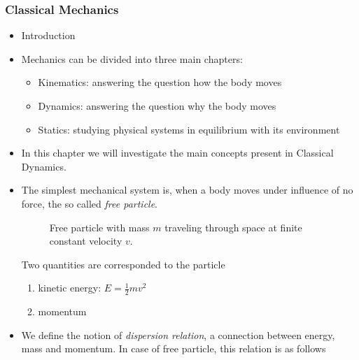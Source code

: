 \documentclass[t,aspectratio=169]{beamer}
\begin{document}
\begin{frame}
\frametitle{Classical Mechanics}
\begin{itemize}
\item Introduction
\item Mechanics can be divided into three main chapters:
\begin{itemize}
\item Kinematics: answering the question how the body moves
\item Dynamics: answering the question why the body moves
\item Statics: studying physical systems in equilibrium with its environment
\end{itemize}
\item In this chapter we will investigate the main concepts present in Classical Dynamics.

\pagebreak 
\item The simplest mechanical system is, when a body moves under influence of no force, the so called \emph{free particle}.
\begin{center}
\begin{figure}
\caption{Free particle with mass $m$ traveling through space at finite constant velocity $v$.}
\end{figure}
\end{center}
Two quantities are corresponded to the particle
\begin{enumerate}
\item kinetic energy: $E=\frac{1}{2}mv^{2}$
\item momentum
\end{enumerate}
\item We define the notion of \emph{dispersion relation}, a connection between energy, mass and momentum. In case of free particle, this relation is as follows


\pagebreak


\end{itemize}
\end{frame}
\end{document}
